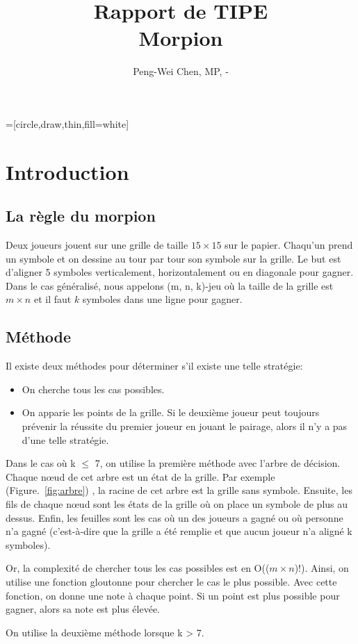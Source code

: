 \documentclass[12pt, a4paper]{article}
\title{Rapport de TIPE\\
Morpion}
\author{Peng-Wei Chen, MP, \oldstylenums{2017}-\oldstylenums{2018}}
\date{}
\begin{document}
\maketitle
{}=[circle,draw,thin,fill=white]

\section{Introduction}
\subsection{La règle du morpion}
Deux joueurs jouent sur une grille de taille $15 \times 15$ sur le papier. Chaqu'un prend un symbole et on dessine au tour par tour son symbole sur la grille. Le but est d'aligner 5 symboles verticalement, horizontalement ou en diagonale pour gagner.
Dans le cas généralisé, nous appelons (m, n, k)-jeu où la taille de la grille est $m \times n$ et il faut $k$ symboles dans une ligne pour gagner.
\subsection{Méthode}
Il existe deux méthodes pour déterminer s'il existe une telle stratégie:
\begin{itemize}
    \item On cherche tous les cas possibles.
    \item On apparie les points de la grille. Si le deuxième joueur peut toujours prévenir la réussite du premier joueur en jouant le pairage, alors il n'y a pas d'une telle stratégie.
\end{itemize}

Dans le cas où k $\le$ 7, on utilise la première méthode avec l'arbre de décision. Chaque nœud de cet arbre est un état de la grille. Par exemple (\mbox{Figure. \ref{fig:arbre}}) , la racine de cet arbre est la grille sans symbole. Ensuite, les fils de chaque nœud sont les états de la grille où on place un symbole de plus au dessus. Enfin, les feuilles sont les cas où un des joueurs a gagné ou où personne n'a gagné (c'est-à-dire que la grille a été remplie et que aucun joueur n'a aligné k symboles).


Or, la complexité de chercher tous les cas possibles est en O(($m \times n$)!). Ainsi, on utilise une fonction gloutonne pour chercher le cas le \og plus \fg possible. Avec cette fonction, on donne une note à chaque point. Si un point est plus possible pour gagner, alors sa note est plus élevée.\par
On utilise la deuxième méthode lorsque k > 7.
\end{document}
